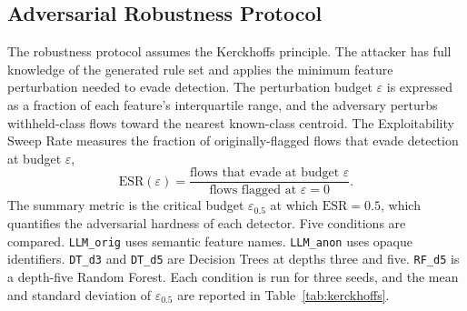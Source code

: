 \subsection{Adversarial Robustness Protocol}
\label{subsec:kerckhoffs}

The robustness protocol assumes the Kerckhoffs principle. The attacker has
full knowledge of the generated rule set and applies the minimum feature
perturbation needed to evade detection. The perturbation budget $\varepsilon$
is expressed as a fraction of each feature's interquartile range, and the
adversary perturbs withheld-class flows toward the nearest known-class
centroid. The Exploitability Sweep Rate measures the fraction of
originally-flagged flows that evade detection at budget $\varepsilon$,
\[
  \mathrm{ESR}(\varepsilon) = \frac{\text{flows that evade at budget } \varepsilon}
                                   {\text{flows flagged at } \varepsilon = 0} .
\]
The summary metric is the critical budget $\varepsilon_{0.5}$ at which
$\mathrm{ESR}=0.5$, which quantifies the adversarial hardness of each
detector. Five conditions are compared. \texttt{LLM\_orig} uses semantic
feature names. \texttt{LLM\_anon} uses opaque identifiers. \texttt{DT\_d3}
and \texttt{DT\_d5} are Decision Trees at depths three and five.
\texttt{RF\_d5} is a depth-five Random Forest. Each condition is run for
three seeds, and the mean and standard deviation of $\varepsilon_{0.5}$ are
reported in Table~\ref{tab:kerckhoffs}.

